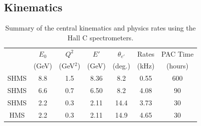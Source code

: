 \subsection{Kinematics}
\begin{table}
\begin{center}

\begin{tabular}{c|c|c|c|c|c|c}
& $E_0$ & $Q^2$    	& $E'$  &    $\theta_{e'}$  &  Rates   & PAC Time   \\
& (GeV) & (GeV$^2$)  & (GeV)  &     (deg.)   &   (kHz)  & (hours) \\
\hline\hline
SHMS & 8.8	&  1.5	&  8.36	&    8.2 	&    0.55	&   600 \\
SHMS & 6.6	&  0.7	&  6.50	&    8.2 	&    4.08	&   90 \\
SHMS & 2.2	&  0.3	&  2.11	&    14.4 	&    3.73	&   30 \\
HMS  & 2.2	&  0.3	&  2.11	&    14.9	&    4.65	&   30 \\  

\hline\hline
\end{tabular}
\caption{\label{RATES1}Summary of the central kinematics and physics rates using the Hall C  spectrometers.}
\end{center}
\end{table}


